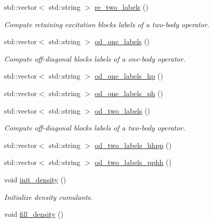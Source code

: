 \begin{DoxyCompactItemize}
std\+::vector$<$ std\+::string $>$ \mbox{\hyperlink{classforte_1_1_m_a_s_t_e_r___d_s_r_g_a758e583687b71d6d6f7f07e8058e3c02}{re\+\_\+two\+\_\+labels}} ()
\begin{DoxyCompactList}\small\item\em Compute retaining excitation blocks labels of a two-\/body operator. \end{DoxyCompactList}\item 
std\+::vector$<$ std\+::string $>$ \mbox{\hyperlink{classforte_1_1_m_a_s_t_e_r___d_s_r_g_a04de384d7802e74b7b2b296416e5efc5}{od\+\_\+one\+\_\+labels}} ()
\begin{DoxyCompactList}\small\item\em Compute off-\/diagonal blocks labels of a one-\/body operator. \end{DoxyCompactList}\item 
std\+::vector$<$ std\+::string $>$ \mbox{\hyperlink{classforte_1_1_m_a_s_t_e_r___d_s_r_g_a2d357f21cfd11767e4c58a14cace3238}{od\+\_\+one\+\_\+labels\+\_\+hp}} ()
\item 
std\+::vector$<$ std\+::string $>$ \mbox{\hyperlink{classforte_1_1_m_a_s_t_e_r___d_s_r_g_aca3dcf6d0a5ec5a538beac5508dcf399}{od\+\_\+one\+\_\+labels\+\_\+ph}} ()
\item 
std\+::vector$<$ std\+::string $>$ \mbox{\hyperlink{classforte_1_1_m_a_s_t_e_r___d_s_r_g_a18c15fdf7089cb3ad61520cd029e4f13}{od\+\_\+two\+\_\+labels}} ()
\begin{DoxyCompactList}\small\item\em Compute off-\/diagonal blocks labels of a two-\/body operator. \end{DoxyCompactList}\item 
std\+::vector$<$ std\+::string $>$ \mbox{\hyperlink{classforte_1_1_m_a_s_t_e_r___d_s_r_g_a6f2ddd225781fb51e056d898e278fba8}{od\+\_\+two\+\_\+labels\+\_\+hhpp}} ()
\item 
std\+::vector$<$ std\+::string $>$ \mbox{\hyperlink{classforte_1_1_m_a_s_t_e_r___d_s_r_g_aff8a67af19b38e5a6b27bf2811270f00}{od\+\_\+two\+\_\+labels\+\_\+pphh}} ()
\item 
void \mbox{\hyperlink{classforte_1_1_m_a_s_t_e_r___d_s_r_g_a976cfcc3d51a53862d3c64a350c3d0cc}{init\+\_\+density}} ()
\begin{DoxyCompactList}\small\item\em Initialize density cumulants. \end{DoxyCompactList}\item 
void \mbox{\hyperlink{classforte_1_1_m_a_s_t_e_r___d_s_r_g_aa564f00007eb21036c638873e43f4c44}{fill\+\_\+density}} ()

\end{DoxyCompactItemize}
